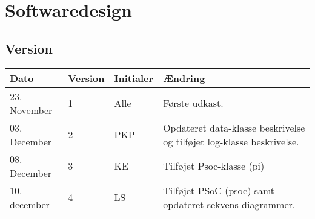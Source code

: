 \chapter{Softwaredesign} \label{ch:softwaredesign}

\section*{Version}
\begin{table}[h]
	\centering
	\begin{tabularx}{\textwidth - 2cm}{|l|l|l|X|}
	\hline
	Dato			& Version		& Initialer 	& Ændring																	\\ \hline
	23. November	& 1 			& Alle			& Første udkast. 															\\ \hline
	03. December 	& 2 			& PKP			& Opdateret data-klasse beskrivelse og tilføjet log-klasse beskrivelse. 	\\ \hline
	08. December 	& 3 			& KE			& Tilføjet Psoc-klasse (pi) 											\\ \hline
	10. december 	& 4 			& LS			& Tilføjet PSoC (psoc) samt opdateret sekvens diagrammer.					\\ \hline
\end{tabularx}
\end{table}
\clearpage


\clearpage

\clearpage

\clearpage


